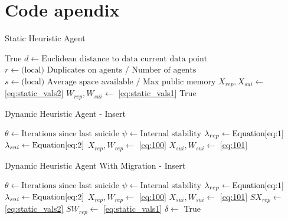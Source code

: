 \documentclass{UoYCSproject}
\begin{document}


\appendix
\chapter{Code apendix}

\begin{algorithm}
\caption{Static Heuristic Agent}
\label{Agent_Control_Loop2}
\begin{algorithmic}[1]
\State {}
\State
{}
\State {}
\State \Return True
\EndIf
\State
\State $d \gets \text{Euclidean distance to data current data point}$
\State $r \gets \text{(local) Duplicates on agents / Number of agents}$
\State $s \gets \text{(local) Average space available / Max public memory}$
\State $X_{rep}, X_{sui} \gets $ \ref{eq:static_vals2}
\State $W_{rep}, W_{sui} \gets $ \ref{eq:static_vals1}
\State
{}
\State {}
\EndIf
\State
{}
\State {}
\EndIf
\State
\State {}
\State
\State \Return True
\EndProcedure
\end{algorithmic}
\end{algorithm}

\begin{algorithm}
\caption{Dynamic Heuristic Agent - Insert}
\label{Agent_Control_Loop3}
\begin{algorithmic}[1]
\State $\theta \gets \text{Iterations since last suicide}$
\State $\psi \gets \text{Internal stability}$
\State $\lambda_{rep} \gets \text{Equation} \ref{eq:1}$
\State $\lambda_{sui}  \gets \text{Equation} \ref{eq:2}$
\State $X_{rep}, W_{rep} \gets $ \ref{eq:100}
\State $X_{sui}, W_{sui} \gets $ \ref{eq:101}
\end{algorithmic}
\end{algorithm}

\begin{algorithm}
\caption{Dynamic Heuristic Agent With Migration - Insert}
\label{Agent_Control_Loop3}
\begin{algorithmic}[1]
\State $\theta \gets \text{Iterations since last suicide}$
\State $\psi \gets \text{Internal stability}$
\State $\lambda_{rep} \gets \text{Equation} \ref{eq:1}$
\State $\lambda_{sui}  \gets \text{Equation} \ref{eq:2}$
\State $X_{rep}, W_{rep} \gets $ \ref{eq:100}
\State $X_{sui}, W_{sui} \gets $ \ref{eq:101}
\State
\State $SX_{rep} \gets $ \ref{eq:static_vals2}
\State $SW_{rep} \gets $ \ref{eq:static_vals1}
\State
\State $\delta \gets$ 
\State
{}
\State {}
\State
{}
\State {}
\State \Return True
\EndIf
\EndIf
\end{algorithmic}
\end{algorithm}
\end{document}
